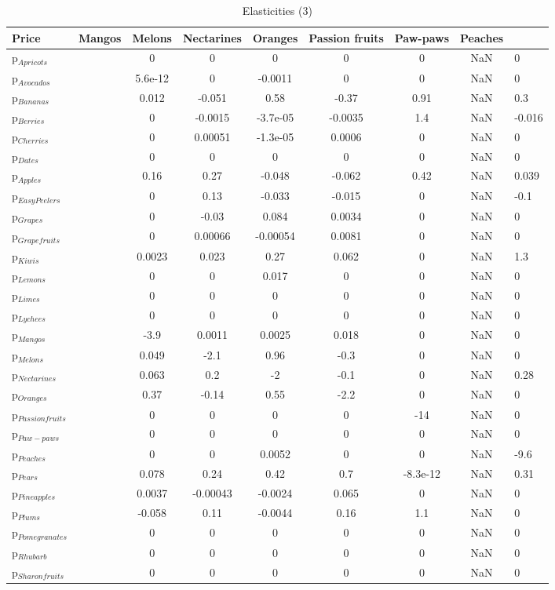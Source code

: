 \documentclass[11pt]{article}
\begin{document}
\begin{table}[h]
\caption{Elasticities (3)}
\label{Table: elasticities 3}
\begin{center}
\begin{tabular}{lccccccc} \hline \hline
Price &Mangos &Melons &Nectarines &Oranges &Passion fruits &Paw-paws &Peaches \\ \hline
p$_{Apricots}$ & &0 &0 &0 &0 &0 &NaN &0 \\
p$_{Avocados}$ & &5.6e-12 &0 &-0.0011 &0 &0 &NaN &0 \\
p$_{Bananas}$ & &0.012 &-0.051 &0.58 &-0.37 &0.91 &NaN &0.3 \\
p$_{Berries}$ & &0 &-0.0015 &-3.7e-05 &-0.0035 &1.4 &NaN &-0.016 \\
p$_{Cherries}$ & &0 &0.00051 &-1.3e-05 &0.0006 &0 &NaN &0 \\
p$_{Dates}$ & &0 &0 &0 &0 &0 &NaN &0 \\
p$_{Apples}$ & &0.16 &0.27 &-0.048 &-0.062 &0.42 &NaN &0.039 \\
p$_{Easy Peelers}$ & &0 &0.13 &-0.033 &-0.015 &0 &NaN &-0.1 \\
p$_{Grapes}$ & &0 &-0.03 &0.084 &0.0034 &0 &NaN &0 \\
p$_{Grapefruits}$ & &0 &0.00066 &-0.00054 &0.0081 &0 &NaN &0 \\
p$_{Kiwis}$ & &0.0023 &0.023 &0.27 &0.062 &0 &NaN &1.3 \\
p$_{Lemons}$ & &0 &0 &0.017 &0 &0 &NaN &0 \\
p$_{Limes}$ & &0 &0 &0 &0 &0 &NaN &0 \\
p$_{Lychees}$ & &0 &0 &0 &0 &0 &NaN &0 \\
p$_{Mangos}$ & &-3.9 &0.0011 &0.0025 &0.018 &0 &NaN &0 \\
p$_{Melons}$ & &0.049 &-2.1 &0.96 &-0.3 &0 &NaN &0 \\
p$_{Nectarines}$ & &0.063 &0.2 &-2 &-0.1 &0 &NaN &0.28 \\
p$_{Oranges}$ & &0.37 &-0.14 &0.55 &-2.2 &0 &NaN &0 \\
p$_{Passion fruits}$ & &0 &0 &0 &0 &-14 &NaN &0 \\
p$_{Paw-paws}$ & &0 &0 &0 &0 &0 &NaN &0 \\
p$_{Peaches}$ & &0 &0 &0.0052 &0 &0 &NaN &-9.6 \\
p$_{Pears}$ & &0.078 &0.24 &0.42 &0.7 &-8.3e-12 &NaN &0.31 \\
p$_{Pineapples}$ & &0.0037 &-0.00043 &-0.0024 &0.065 &0 &NaN &0 \\
p$_{Plums}$ & &-0.058 &0.11 &-0.0044 &0.16 &1.1 &NaN &0 \\
p$_{Pomegranates}$ & &0 &0 &0 &0 &0 &NaN &0 \\
p$_{Rhubarb}$ & &0 &0 &0 &0 &0 &NaN &0 \\
p$_{Sharon fruits}$ & &0 &0 &0 &0 &0 &NaN &0 \\
\end{tabular}
\end{center}
\end{table}
\end{document}
